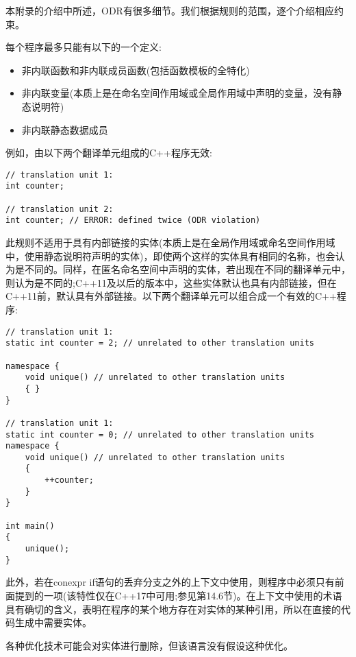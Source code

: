 
本附录的介绍中所述，ODR有很多细节。我们根据规则的范围，逐个介绍相应约束。


每个程序最多只能有以下的一个定义:

\begin{itemize}
\item 
非内联函数和非内联成员函数(包括函数模板的全特化)

\item 
非内联变量(本质上是在命名空间作用域或全局作用域中声明的变量，没有静态说明符)

\item 
非内联静态数据成员
\end{itemize}

例如，由以下两个翻译单元组成的C++程序无效:

\begin{lstlisting}[style=styleCXX]
// translation unit 1:
int counter;

// translation unit 2:
int counter; // ERROR: defined twice (ODR violation)
\end{lstlisting}

此规则不适用于具有内部链接的实体(本质上是在全局作用域或命名空间作用域中，使用静态说明符声明的实体)，即使两个这样的实体具有相同的名称，也会认为是不同的。同样，在匿名命名空间中声明的实体，若出现在不同的翻译单元中，则认为是不同的;C++11及以后的版本中，这些实体默认也具有内部链接，但在C++11前，默认具有外部链接。以下两个翻译单元可以组合成一个有效的C++程序:

\begin{lstlisting}[style=styleCXX]
// translation unit 1:
static int counter = 2; // unrelated to other translation units

namespace {
	void unique() // unrelated to other translation units
	{ }
}

// translation unit 1:
static int counter = 0; // unrelated to other translation units
namespace {
	void unique() // unrelated to other translation units
	{
		++counter;
	}
}

int main()
{
	unique();
}
\end{lstlisting}

此外，若在conexpr if语句的丢弃分支之外的上下文中使用，则程序中必须只有前面提到的一项(该特性仅在C++17中可用;参见第14.6节)。在上下文中使用的术语具有确切的含义，表明在程序的某个地方存在对实体的某种引用，所以在直接的代码生成中需要实体。

\begin{tcolorbox}[colback=webgreen!5!white,colframe=webgreen!75!black]
\hspace*{0.75cm}各种优化技术可能会对实体进行删除，但该语言没有假设这种优化。
\end{tcolorbox}

